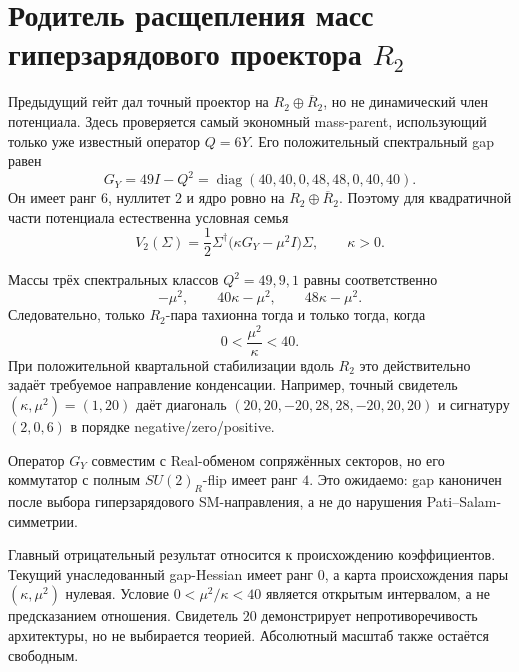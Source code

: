 \chapter{Родитель расщепления масс гиперзарядового проектора
\texorpdfstring{$R_2$}{R2}}
\label{ch:v10-h15-r2-hypercharge-mass-parent}

Предыдущий гейт дал точный проектор на
$R_2\oplus\overline R_2$, но не динамический член потенциала. Здесь
проверяется самый экономный mass-parent, использующий только уже известный
оператор $Q=6Y$. Его положительный спектральный gap равен
\begin{equation}
 \boxed{G_Y=49I-Q^2}
 =\operatorname{diag}(40,40,0,48,48,0,40,40).
\end{equation}
Он имеет ранг $6$, нуллитет $2$ и ядро ровно на
$R_2\oplus\overline R_2$. Поэтому для квадратичной части потенциала
естественна условная семья
\begin{equation}
 V_2(\Sigma)=\frac12\Sigma^\dagger
 \bigl(\kappa G_Y-\mu^2I\bigr)\Sigma,
 \qquad \kappa>0.
\end{equation}

Массы трёх спектральных классов $Q^2=49,9,1$ равны соответственно
\begin{equation}
 -\mu^2,\qquad 40\kappa-\mu^2,\qquad 48\kappa-\mu^2.
\end{equation}
Следовательно, только $R_2$-пара тахионна тогда и только тогда, когда
\begin{equation}
 \boxed{0<\frac{\mu^2}{\kappa}<40}.
\end{equation}
При положительной квартальной стабилизации вдоль $R_2$ это действительно
задаёт требуемое направление конденсации. Например, точный свидетель
$(\kappa,\mu^2)=(1,20)$ даёт диагональ
$(20,20,-20,28,28,-20,20,20)$ и сигнатуру $(2,0,6)$ в порядке
negative/zero/positive.

Оператор $G_Y$ совместим с Real-обменом сопряжённых секторов, но его
коммутатор с полным $SU(2)_R$-flip имеет ранг $4$. Это ожидаемо: gap
каноничен после выбора гиперзарядового SM-направления, а не до нарушения
Pati--Salam-симметрии.

Главный отрицательный результат относится к происхождению коэффициентов.
Текущий унаследованный gap-Hessian имеет ранг $0$, а карта происхождения
пары $(\kappa,\mu^2)$ нулевая. Условие $0<\mu^2/\kappa<40$ является открытым
интервалом, а не предсказанием отношения. Свидетель $20$ демонстрирует
непротиворечивость архитектуры, но не выбирается теорией. Абсолютный
масштаб также остаётся свободным.

